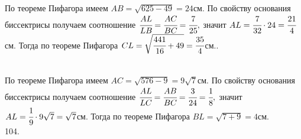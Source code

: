 \documentclass[12pt]{article}
\begin{document}
По теореме Пифагора имеем $AB=\sqrt{625-49}=24$см. По свойству основания биссектрисы получаем соотношение $\cfrac{AL}{LB}=\cfrac{AC}{BC}=\cfrac{7}{25},$ значит $AL=\cfrac{7}{32}\cdot24=\cfrac{21}{4}$см. Тогда  по теореме Пифагора $CL=\sqrt{\cfrac{441}{16}+49}=\cfrac{35}{4}$см.\newpage{}. \begin{figure}[ht!]
\end{figure}\\
По теореме Пифагора имеем $AC=\sqrt{576-9}=9\sqrt{7}$см. По свойству основания биссектрисы получаем соотношение $\cfrac{AL}{LC}=\cfrac{AB}{BC}=\cfrac{3}{24}=\cfrac{1}{8},$ значит $AL=\cfrac{1}{9}\cdot9\sqrt{7}=\sqrt{7}$см. Тогда  по теореме Пифагора $BL=\sqrt{7+9}=4$см.\\
104. \begin{figure}[ht!]
\end{figure}\\
\end{document}
